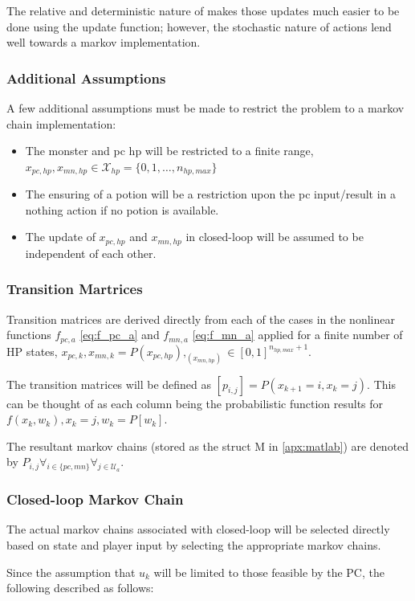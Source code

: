 \documentclass[letterpaper, 10 pt, conference]{ieeeconf}
\begin{document}
The relative and deterministic nature of makes those updates much easier to be done using the update function; however, the stochastic nature of actions lend well towards a markov implementation.
\subsubsection{Additional Assumptions}
A few additional assumptions must be made to restrict the problem to a markov chain implementation:
\begin{itemize}
    \item The monster and pc hp will be restricted to a finite range, $x_{pc,hp},x_{mn,hp} \in \mathcal{X}_{hp} = \{0,1,\dots, n_{hp,max}\}$
    \item The ensuring of a potion will be a restriction upon the pc input/result in a nothing action if no potion is available.
    \item The update of $x_{pc,hp}$ and $x_{mn,hp}$ in closed-loop will be assumed to be independent of each other.
\end{itemize}

\subsubsection{Transition Martrices}
Transition matrices are derived directly from each of the cases in the nonlinear functions $f_{pc,a}$ \eqref{eq:f_pc_a} and $f_{mn,a}$ \eqref{eq:f_mn_a} applied for a finite number of HP states, $x_{pc,k}, x_{mn,k} = P(x_{pc,hp}), _(x_{mn,hp}) \in [0,1]^{n_{hp,max}+1}$.

The transition matrices will be defined as $[p_{i,j}] = P(x_{k+1} = i, x_{k} = j)$.
This can be thought of as each column being the probabilistic function results for $f(x_k,w_k), x_{k} = j, w_k = P[w_k]$.

The resultant markov chains (stored as the struct M in \autoref{apx:matlab}) are denoted by $P_{i,j} \forall_{i\in\{pc,mn\}} \forall_{j\in \mathcal{U}_a}$.
\subsubsection{Closed-loop Markov Chain}
The actual markov chains associated with closed-loop will be selected directly based on state and player input by selecting the appropriate markov chains.

Since the assumption that $u_k$ will be limited to those feasible by the PC, the following described as follows:
\end{document}
